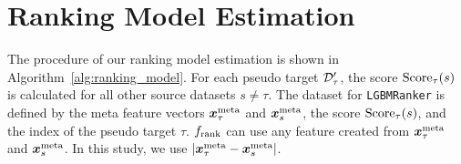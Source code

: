 \section{Ranking Model Estimation}
\label{app:create_rankingdata}

The procedure of our ranking model estimation is shown in Algorithm~\ref{alg:ranking_model}.
%
For each pseudo target ${\mathcal D}^\prime_\tau$, the score $\mathrm{Score}_\tau(s)$ is calculated for all other source datasets $s \neq \tau$. 
%
The dataset for {\tt LGBMRanker} is defined by the meta feature vectors $\boldsymbol{x}^{\mathrm{meta}}_{\tau}$ and $\boldsymbol{x}^{\mathrm{meta}}_s$, the score $\mathrm{Score}_\tau(s)$, and the index of the pseudo target $\tau$. 
%
$f_{\mathrm{rank}}$ can use any feature created from 
$\boldsymbol{x}^{\mathrm{meta}}_{\tau}$ and $\boldsymbol{x}^{\mathrm{meta}}_s$. 
%
In this study, we use 
$|\boldsymbol{x}_\tau^{\rm meta} - \boldsymbol{x}_s^{\rm meta}|$. 


